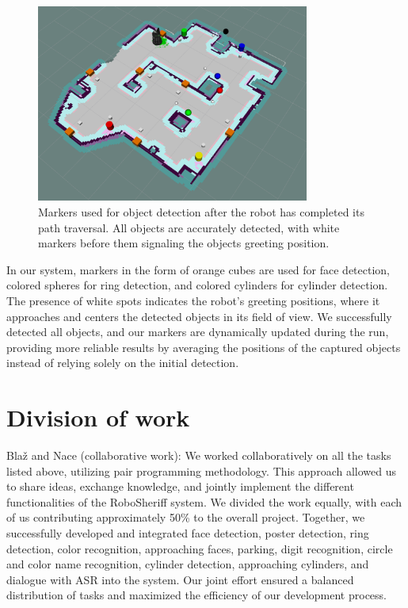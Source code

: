 \documentclass{article}
\begin{document}
\begin{figure}
  \centering
  \includegraphics[width=0.8\textwidth]{images/markers.png}
  \caption{Markers used for object detection after the robot has completed its path traversal. All objects are accurately detected, with white markers before them signaling the objects greeting position.}
  \label{fig:markers}
\end{figure}

In our system, markers in the form of orange cubes are used for face detection, colored spheres for ring detection, and colored cylinders for cylinder detection. The presence of white spots indicates the robot's greeting positions, where it approaches and centers the detected objects in its field of view. We successfully detected all objects, and our markers are dynamically updated during the run, providing more reliable results by averaging the positions of the captured objects instead of relying solely on the initial detection.

\section{Division of work}

Blaž and Nace (collaborative work):
We worked collaboratively on all the tasks listed above, utilizing pair programming methodology. This approach allowed us to share ideas, exchange knowledge, and jointly implement the different functionalities of the RoboSheriff system. We divided the work equally, with each of us contributing approximately 50\% to the overall project. Together, we successfully developed and integrated face detection, poster detection, ring detection, color recognition, approaching faces, parking, digit recognition, circle and color name recognition, cylinder detection, approaching cylinders, and dialogue with ASR into the system. Our joint effort ensured a balanced distribution of tasks and maximized the efficiency of our development process.
\end{document}
